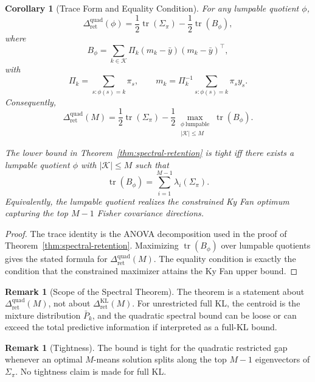 \documentclass[12pt]{article}
\newtheorem{corollary}[theorem]{Corollary}
\theoremstyle{definition}
\newtheorem{remark}[theorem]{Remark}
\DeclareMathOperator{\tr}{tr}
\newcommand{\RetKL}{\Delta_{\mathrm{ret}}^{\mathrm{KL}}}
\newcommand{\RetQuad}{\Delta_{\mathrm{ret}}^{\mathrm{quad}}}
\begin{document}
\begin{corollary}[Trace Form and Equality Condition]
\label{cor:quad-trace-equality}
For any lumpable quotient $\phi$,
\[
\RetQuad(\phi)
=
\frac12\tr(\Sigma_\pi)
-
\frac12\tr(B_\phi),
\]
where
\[
B_\phi
=
\sum_{k\in\mathcal K}
\Pi_k
(m_k-\bar y)(m_k-\bar y)^\top,
\]
with
\[
\Pi_k=\sum_{s:\phi(s)=k}\pi_s,
\qquad
m_k=\Pi_k^{-1}\sum_{s:\phi(s)=k}\pi_s y_s.
\]
Consequently,
\[
\RetQuad(M)
=
\frac12\tr(\Sigma_\pi)
-
\frac12
\max_{\substack{
\phi\ \text{lumpable}\\
|\mathcal K|\le M
}}
\tr(B_\phi).
\]

The lower bound in Theorem~\ref{thm:spectral-retention} is tight iff there
exists a lumpable quotient $\phi$ with $|\mathcal K|\le M$ such that
\[
\tr(B_\phi)
=
\sum_{i=1}^{M-1}
\lambda_i(\Sigma_\pi).
\]
Equivalently, the lumpable quotient realizes the constrained Ky Fan optimum
capturing the top $M-1$ Fisher covariance directions.
\end{corollary}

\begin{proof}
The trace identity is the ANOVA decomposition used in the proof of
Theorem~\ref{thm:spectral-retention}.  Maximizing $\tr(B_\phi)$ over lumpable
quotients gives the stated formula for $\RetQuad(M)$.  The equality condition
is exactly the condition that the constrained maximizer attains the Ky Fan
upper bound.
\end{proof}


\begin{remark}[Scope of the Spectral Theorem]
\label{rem:spectral-not-full-kl}
The theorem is a statement about $\RetQuad(M)$, not about $\RetKL(M)$.  For
unrestricted full KL, the centroid is the mixture distribution $\bar P_k$, and
the quadratic spectral bound can be loose or can exceed the total predictive
information if interpreted as a full-KL bound.
\end{remark}

\begin{remark}[Tightness]
\label{rem:quad-tightness}
The bound is tight for the quadratic restricted gap whenever an optimal
$M$-means solution splits along the top $M-1$ eigenvectors of
$\Sigma_\pi$.  No tightness claim is made for full KL.
\end{remark}
\end{document}
